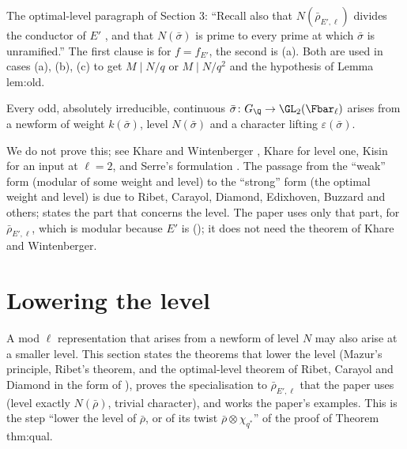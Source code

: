\begin{paperlink}
The optimal-level paragraph of Section 3: ``Recall also that $N(\bar\rho_{E',\ell})$ divides the conductor of $E'$ \cite{Carayol89}, and that $N(\bar\sigma)$ is prime to
every prime at which $\bar\sigma$ is unramified.'' The first clause is  for $f=f_{E'}$, the second is
(a). Both are used in cases (a), (b), (c) to get $M\mid N/q$ or $M\mid N/q^2$ and the hypothesis of Lemma lem:old.
\end{paperlink}

\begin{theorem}\label{thm:modgalrep:serre-conjecture}
Every odd, absolutely irreducible, continuous $\bar\sigma\colon G_\Q\to\GL_2(\Fbar_\ell)$ arises from a newform of weight $k(\bar\sigma)$, level $N(\bar\sigma)$ and a character
lifting $\varepsilon(\bar\sigma)$.
\end{theorem}

We do not prove this; see Khare and Wintenberger \cite{KhareWintenberger}, Khare \cite{Khare} for level one, Kisin \cite{Kisin09} for an input at
$\ell=2$, and Serre's formulation \cite{Serre87}. The passage from the ``weak'' form (modular of some weight and level) to the ``strong'' form
(the optimal weight and level) is due to Ribet, Carayol, Diamond, Edixhoven, Buzzard and others;  states the part
that concerns the level. The paper uses only that part, for $\bar\rho_{E',\ell}$, which is modular because $E'$ is (); it does not need the
theorem of Khare and Wintenberger.

\section{Lowering the level}\label{sec:modgalrep:lowering}

A mod $\ell$ representation that arises from a newform of level $N$ may also arise at a smaller level. This section states the theorems that
lower the level (Mazur's principle, Ribet's theorem, and the optimal-level theorem of Ribet, Carayol and Diamond in the form of
\cite[Theorem 3.15]{DDT}), proves the specialisation to $\bar\rho_{E',\ell}$ that the paper uses (level exactly $N(\bar\rho)$, trivial character), and works the
paper's examples. This is the step ``lower the level of $\bar\rho$, or of its twist $\bar\rho\otimes\chi_{q^*}$'' of the proof of Theorem thm:qual.

